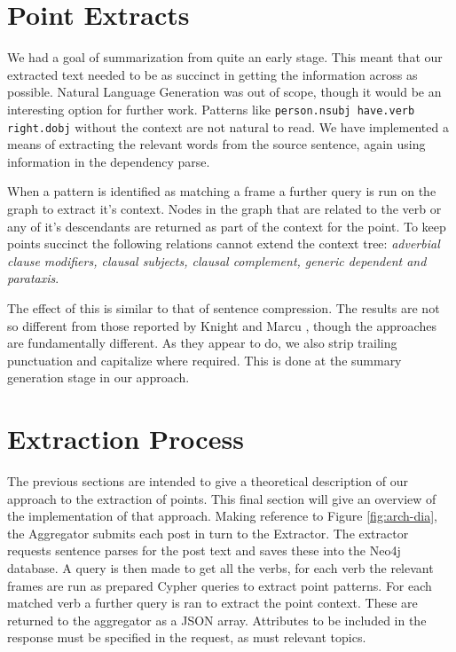   \section{Point Extracts}
    We had a goal of summarization from quite an early stage. This meant that our extracted text needed to be as succinct in getting the information across as possible. Natural Language Generation was out of scope, though it would be an interesting option for further work. Patterns like \texttt{person.nsubj have.verb right.dobj} without the context are not natural to read. We have implemented a means of extracting the relevant words from the source sentence, again using information in the dependency parse.

    When a pattern is identified as matching a frame a further query is run on the graph to extract it's context. Nodes in the graph that are related to the verb or any of it's descendants are returned as part of the context for the point. To keep points succinct the following relations cannot extend the context tree: \textit{adverbial clause modifiers, clausal subjects, clausal complement, generic dependent and parataxis}.

    The effect of this is similar to that of sentence compression. The results are not so different from those reported by Knight and Marcu \cite{knight2000statistics}, though the approaches are fundamentally different. As they appear to do, we also strip trailing punctuation and capitalize where required. This is done at the summary generation stage in our approach.

  \section{Extraction Process}
    The previous sections are intended to give a theoretical description of our approach to the extraction of points. This final section will give an overview of the implementation of that approach.
    Making reference to Figure \ref{fig:arch-dia}, the Aggregator submits each post in turn to the Extractor. The extractor requests sentence parses for the post text and saves these into the Neo4j database. A query is then made to get all the verbs, for each verb the relevant frames are run as prepared Cypher queries to extract point patterns. For each matched verb a further query is ran to extract the point context. These are returned to the aggregator as a JSON array. Attributes to be included in the response must be specified in the request, as must relevant topics.

